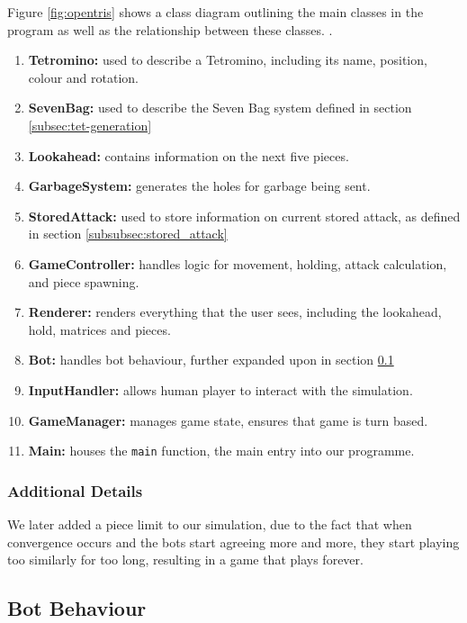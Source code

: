 \documentclass[a4paper, 12pt]{extreport}
\begin{document}
				Figure \ref{fig:opentris} shows a class diagram outlining the main classes in the program as well as the relationship between these classes. .
				
				\begin{enumerate}
					\item \textbf{Tetromino:} used to describe a Tetromino, including its name, position, colour and rotation.
					\item \textbf{SevenBag:} used to describe the Seven Bag system defined in section \ref{subsec:tet-generation}
					\item \textbf{Lookahead:} contains information on the next five pieces.
					\item \textbf{GarbageSystem:} generates the holes for garbage being sent.
					\item \textbf{StoredAttack:} used to store information on current stored attack, as defined in section \ref{subsubsec:stored_attack}
					\item \textbf{GameController:} handles logic for movement, holding, attack calculation, and piece spawning.
					\item \textbf{Renderer:} renders everything that the user sees, including the lookahead, hold, matrices and pieces.
					\item \textbf{Bot:} handles bot behaviour, further expanded upon in section \ref{subsec:bot}
					\item \textbf{InputHandler:} allows human player to interact with the simulation.
					\item \textbf{GameManager:} manages game state, ensures that game is turn based.
					\item \textbf{Main:} houses the \verb|main| function, the main entry into our programme.
				\end{enumerate}
				
			\subsubsection{Additional Details}
			
				We later added a piece limit to our simulation, due to the fact that when convergence occurs and the bots start agreeing more and more, they start playing too similarly for too long, resulting in a game that plays forever.
		
		\subsection{Bot Behaviour}\label{subsec:bot}
		
\end{document}
